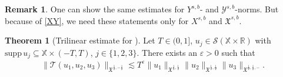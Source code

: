 \documentclass[reqno]{amsart}
\theoremstyle{Definitionl}
\theoremstyle{Definitionk}
\theoremstyle{definition}
\theoremstyle{Satzk}
\theoremstyle{Satzl}
\newtheorem{satzl}[defi]{Theorem}
\theoremstyle{Bemerkung}
\newtheorem*{bem*}{Remark}
\begin{document}
\begin{bem*}
One can show the same estimates for $Y^{s,b}$- and $\mathcal Y^{s,b}$-norms. But because of \eqref{XY}, we need these statements only for $X^{s,b}$ and $\mathfrak X^{s,b}$.
\end{bem*}
\begin{satzl}[Trilinear estimate for \unboldmath{}]\label{L6}
Let $T\in(0,1]$, $u_j\in\mathcal S(\mathbb X\times\mathbb R)$ with $\mathrm{supp}\,u_j\subseteq\mathbb X\times(-T,T)$, $j\in\{1,2,3\}$. There exists an $\varepsilon>0$ such that
\begin{align}\label{TX}
\|\mathcal T(u_1,u_2,u_3)\|_{\mathfrak X^{\frac12,-\frac12}}\lesssim T^\varepsilon\|u_1\|_{\mathfrak X^{\frac12,\frac12}}\|u_2\|_{\mathfrak X^{\frac12,\frac12}}\|u_3\|_{\mathfrak X^{\frac12,\frac12,-}}.
\end{align}
\end{satzl}
\end{document}
